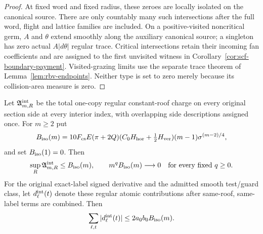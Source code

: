 \begin{proof}
At fixed word and fixed radius, these zeroes are locally isolated
on the canonical source. There are only countably many such
intersections after the full word, flight and lattice families
are included. On a positive-visited noncritical germ, $A$ and
$\theta$ extend smoothly along the auxiliary canonical source;
a singleton has zero actual $A|d\theta|$ regular trace.
Critical intersections retain their incoming fan coefficients and
are assigned to the first unvisited witness in
Corollary~\ref{cor:scf-boundary-payment}. Visited-grazing limits
use the separate trace theorem of Lemma~\ref{lem:rbv-endpoints}.
Neither type is set to zero merely because its collision-area
measure is zero.
\end{proof}

\begin{corollary}
\label{cor:iso-all-interior}
Let $\mathfrak A^{\rm int}_{m,R}$ be the total one-copy regular
constant-roof charge on every original section side at every
interior index, with overlapping side descriptions assigned once.
For $m\ge2$ put
\begin{equation}\label{eq:iso-Bint}
 B_{\rm iso}(m)=
 10F_{\rm cs}E(\pi+2Q)
       (C_0H_{\rm hor}+\tfrac12H_{\rm ver})
       (m-1)\sigma^{(m-2)/4},
\end{equation}
and set $B_{\rm iso}(1)=0$. Then
\[
 \sup_R\mathfrak A^{\rm int}_{m,R}\le B_{\rm iso}(m),
 \qquad
 m^qB_{\rm iso}(m)\longrightarrow0
 \quad\text{for every fixed }q\ge0.
\]
For the original exact-label signed derivative and the admitted
smooth test/guard class, let $d_\ell^{\rm int}(t)$ denote these
regular atomic contributions after same-roof, same-label terms
are combined. Then
\begin{equation}\label{eq:iso-signed}
 \sum_{\ell,t}|d_\ell^{\rm int}(t)|
                   \le2a_0b_0 B_{\rm iso}(m).
\end{equation}
\end{corollary}
